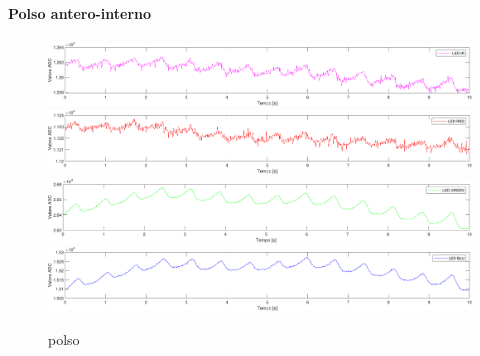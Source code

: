 \paragraph{Polso antero-interno}
\begin{figure}[h]
	\centering
	\includegraphics[width=1\linewidth]{ImageFiles/Misure Preliminari/Soggetto 1/polso_ired}
	\includegraphics[width=1\linewidth]{ImageFiles/Misure Preliminari/Soggetto 1/polso_red}
	\includegraphics[width=1\linewidth]{ImageFiles/Misure Preliminari/Soggetto 1/polso_green}
	\includegraphics[width=1\linewidth]{ImageFiles/Misure Preliminari/Soggetto 1/polso_blu}
	\caption{polso}
	\label{fig:Descrizione_Segnale_PPG}
\end{figure}


